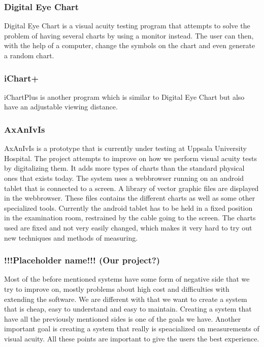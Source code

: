 \documentclass[12pt,a4paper,notitlepage]{report}
\begin{document}
\subsubsection{Digital Eye Chart}
 Digital Eye Chart \cite{digitaleyechart} is a visual acuity testing program that attempts to solve the problem of having several charts by using a monitor instead. The user can then, with the help of a computer, change the symbols on the chart and even generate a random chart. 

\subsubsection{iChart+}
iChartPlus \cite{ichartplus} is another program which is similar to Digital Eye Chart but also have an adjustable viewing distance. 

\subsubsection{AxAnIvIs}
AxAnIvIs is a prototype that is currently under testing at Uppsala University Hospital. The project attempts to improve on how we perform visual acuity tests by digitalizing them. It adds more types of charts than the standard physical ones that exists today. The system uses a webbrowser running on an android tablet that is connected to a screen. A library of vector graphic files are displayed in the webbrowser. These files contains the different charts as well as some other specialized tools. Currently the android tablet has to be held in a fixed position in the examination room, restrained by the cable going to the screen. The charts used are fixed and not very easily changed, which makes it very hard to try out new techniques and methods of measuring.

\subsubsection{!!!Placeholder name!!! (Our project?)} %
Most of the before mentioned systems have some form of negative side that we try to improve on, mostly problems about high cost and difficulties with extending the software. We are different with that we want to create a system that is cheap, easy to understand and easy to maintain. Creating a system that have all the previously mentioned sides is one of the goals we have. Another important goal is creating a system that really is speacialized on measurements of visual acuity. All these points are important to give the users the best experience.
\end{document}
